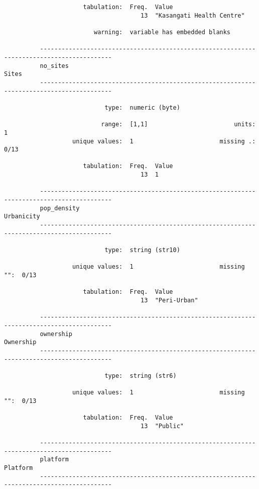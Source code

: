 \documentclass{article}
\begin{document}
\begin{verbatim}
                      tabulation:  Freq.  Value
                                      13  "Kasangati Health Centre"
          
                         warning:  variable has embedded blanks
          
          ------------------------------------------------------------------------------------------
          no_sites                                                                             Sites
          ------------------------------------------------------------------------------------------
          
                            type:  numeric (byte)
          
                           range:  [1,1]                        units:  1
                   unique values:  1                        missing .:  0/13
          
                      tabulation:  Freq.  Value
                                      13  1
          
          ------------------------------------------------------------------------------------------
          pop_density                                                                     Urbanicity
          ------------------------------------------------------------------------------------------
          
                            type:  string (str10)
          
                   unique values:  1                        missing "":  0/13
          
                      tabulation:  Freq.  Value
                                      13  "Peri-Urban"
          
          ------------------------------------------------------------------------------------------
          ownership                                                                        Ownership
          ------------------------------------------------------------------------------------------
          
                            type:  string (str6)
          
                   unique values:  1                        missing "":  0/13
          
                      tabulation:  Freq.  Value
                                      13  "Public"
          
          ------------------------------------------------------------------------------------------
          platform                                                                          Platform
          ------------------------------------------------------------------------------------------
          

\end{verbatim}
\end{document}
